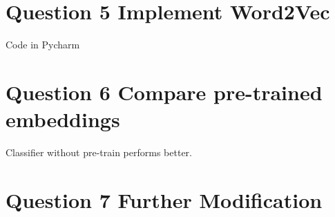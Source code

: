 \documentclass{article} %
\begin{document}
\section*{Question 5 Implement Word2Vec}
Code in Pycharm

\section*{Question 6 Compare pre-trained embeddings}
Classifier without pre-train performs better.

\section*{Question 7 Further Modification}
\end{document}
